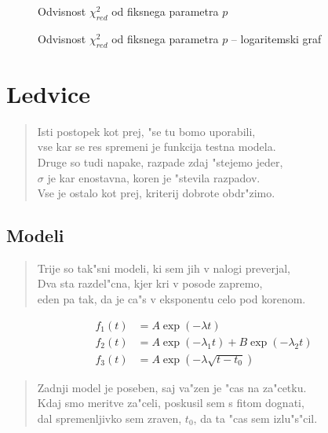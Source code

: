 \documentclass[a4paper,10pt]{article}
\begin{document}
\begin{figure}
 
\caption{Odvisnost $\chi^2_{red}$ od fiksnega parametra $p$ }
\label{fig:farmacija-hi}
\end{figure}

\begin{figure}
 
\caption{Odvisnost $\chi^2_{red}$ od fiksnega parametra $p$ -- logaritemski graf }
\label{fig:farmacija-hi}
\end{figure}

\section{Ledvice}
\begin{verse}
 Isti postopek kot prej, "se tu bomo uporabili, \\
 vse kar se res spremeni je funkcija testna modela. \\
 Druge so tudi napake, razpade zdaj "stejemo jeder, \\
 $\sigma$ je kar enostavna, koren je "stevila razpadov. \\
 Vse je ostalo kot prej, kriterij dobrote obdr"zimo. 
\end{verse}

\subsection{Modeli}
\begin{verse}
 Trije so tak"sni modeli, ki sem jih v nalogi preverjal, \\
 Dva sta razdel"cna, kjer kri v posode zapremo, \\
 eden pa tak, da je ca"s v eksponentu celo pod korenom. 
\end{verse}

\begin{align}
 f_1(t) &= A \exp(-\lambda t) \\
 f_2(t) &= A \exp(-\lambda_1 t) + B \exp(-\lambda_2 t) \\
 f_3(t) &= A \exp(-\lambda \sqrt{t-t_0})
\end{align}

\begin{verse}
 Zadnji model je poseben, saj va"zen je "cas na za"cetku. \\
 Kdaj smo meritve za"celi, poskusil sem s fitom dognati, \\
 dal spremenljivko sem zraven, $t_0$, da ta "cas sem izlu"s"cil. 
\end{verse}
\end{document}
